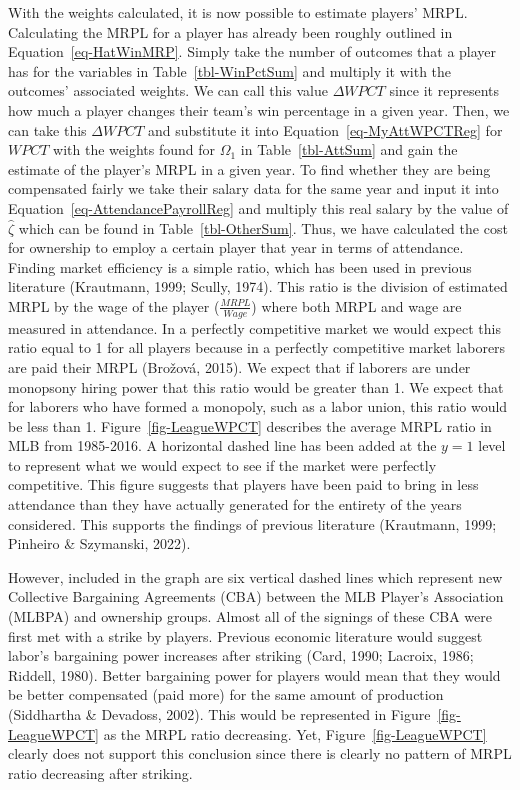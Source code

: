 \documentclass[
  12pt,
  letterpaper,
  DIV=11,
  numbers=noendperiod]{scrartcl}
\begin{document}
With the weights calculated, it is now possible to estimate players'
MRPL. Calculating the MRPL for a player has already been roughly
outlined in Equation~\ref{eq-HatWinMRP}. Simply take the number of
outcomes that a player has for the variables in
Table~\ref{tbl-WinPctSum} and multiply it with the outcomes' associated
weights. We can call this value \(\Delta WPCT\) since it represents how
much a player changes their team's win percentage in a given year. Then,
we can take this \(\Delta WPCT\) and substitute it into
Equation~\ref{eq-MyAttWPCTReg} for \(WPCT\) with the weights found for
\(\Omega_1\) in Table~\ref{tbl-AttSum} and gain the estimate of the
player's MRPL in a given year. To find whether they are being
compensated fairly we take their salary data for the same year and input
it into Equation~\ref{eq-AttendancePayrollReg} and multiply this real
salary by the value of \(\widehat{\zeta}\) which can be found in
Table~\ref{tbl-OtherSum}. Thus, we have calculated the cost for
ownership to employ a certain player that year in terms of attendance.
Finding market efficiency is a simple ratio, which has been used in
previous literature (Krautmann, 1999; Scully, 1974). This ratio is the
division of estimated MRPL by the wage of the player
(\(\frac{MRPL}{Wage}\)) where both MRPL and wage are measured in
attendance. In a perfectly competitive market we would expect this ratio
equal to 1 for all players because in a perfectly competitive market
laborers are paid their MRPL (Brožová, 2015). We expect that if laborers
are under monopsony hiring power that this ratio would be greater than
1. We expect that for laborers who have formed a monopoly, such as a
labor union, this ratio would be less than 1.
Figure~\ref{fig-LeagueWPCT} describes the average MRPL ratio in MLB from
1985-2016. A horizontal dashed line has been added at the \(y=1\) level
to represent what we would expect to see if the market were perfectly
competitive. This figure suggests that players have been paid to bring
in less attendance than they have actually generated for the entirety of
the years considered. This supports the findings of previous literature
(Krautmann, 1999; Pinheiro \& Szymanski, 2022).

However, included in the graph are six vertical dashed lines which
represent new Collective Bargaining Agreements (CBA) between the MLB
Player's Association (MLBPA) and ownership groups. Almost all of the
signings of these CBA were first met with a strike by players. Previous
economic literature would suggest labor's bargaining power increases
after striking (Card, 1990; Lacroix, 1986; Riddell, 1980). Better
bargaining power for players would mean that they would be better
compensated (paid more) for the same amount of production (Siddhartha \&
Devadoss, 2002). This would be represented in
Figure~\ref{fig-LeagueWPCT} as the MRPL ratio decreasing. Yet,
Figure~\ref{fig-LeagueWPCT} clearly does not support this conclusion
since there is clearly no pattern of MRPL ratio decreasing after
striking.
\end{document}
